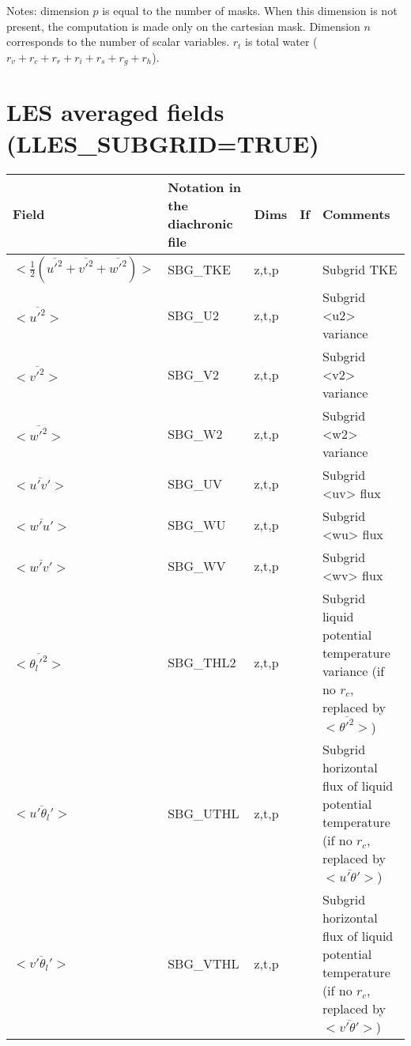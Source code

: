 Notes: dimension $p$ is equal to the number of masks. When this dimension is not present, the computation is made only on the cartesian mask. Dimension $n$ corresponds to the number of scalar variables. $r_t$ is total water ($r_v+r_c+r_r+r_i+r_s+r_g+r_h$).

\section{LES averaged fields (LLES\_SUBGRID=TRUE)}

\begingroup
\renewcommand\arraystretch{1.5}
\begin{longtable}[c]{|p{}|p{}|p{}|p{}|p{}|}
\hline
Field & Notation in the diachronic file & Dims & If  & Comments \\
\hline \hline
\endhead
$<\frac{1}{2}(\overline{u'^2}+\overline{v'^2}+\overline{w'^2})>$ & SBG\_TKE & z,t,p &   & Subgrid TKE \\\hline
$<\overline{u'^2}>$                          & SBG\_U2   & z,t,p   &        & Subgrid <u2> variance \\\hline
$<\overline{v'^2}>$                          & SBG\_V2   & z,t,p   &        & Subgrid <v2> variance \\\hline
$<\overline{w'^2}>$                          & SBG\_W2   & z,t,p   &        & Subgrid <w2> variance \\\hline
$<\overline{u'v'}>$                          & SBG\_UV   & z,t,p   &        & Subgrid <uv> flux \\\hline
$<\overline{w'u'}>$                          & SBG\_WU   & z,t,p   &        & Subgrid <wu> flux \\\hline
$<\overline{w'v'}>$                          & SBG\_WV   & z,t,p   &        & Subgrid <wv> flux \\\hline
$<\overline{\theta_l'^2}>$                   & SBG\_THL2 & z,t,p   &        & Subgrid liquid potential temperature variance (if no $r_c$, replaced by $<\overline{\theta'^2}>$) \\\hline
$<\overline{u'\theta_l'}>$                   & SBG\_UTHL & z,t,p   &        & Subgrid horizontal flux of liquid potential temperature (if no $r_c$, replaced by $<\overline{u'\theta'}>$) \\\hline
$<\overline{v'\theta_l'}>$                   & SBG\_VTHL & z,t,p   &        & Subgrid horizontal flux of liquid potential temperature (if no $r_c$, replaced by $<\overline{v'\theta'}>$) \\\hline

\end{longtable}

